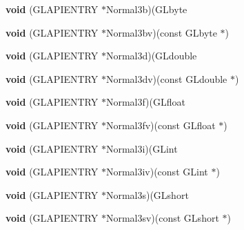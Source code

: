 \begin{DoxyCompactItemize}
{\bfseries void} (G\+L\+A\+P\+I\+E\+N\+T\+RY $\ast$Normal3b)(G\+Lbyte
\item 
\mbox{\label{struct_____g_ldispatch_table_rec_a4e8418c55132720b115a7c1ec9395cbb}} 
{\bfseries void} (G\+L\+A\+P\+I\+E\+N\+T\+RY $\ast$Normal3bv)(const G\+Lbyte $\ast$)
\item 
\mbox{\label{struct_____g_ldispatch_table_rec_a63308fc1a23c3e4e8f3d1923fcc3494b}} 
{\bfseries void} (G\+L\+A\+P\+I\+E\+N\+T\+RY $\ast$Normal3d)(G\+Ldouble
\item 
\mbox{\label{struct_____g_ldispatch_table_rec_a265e7aff94003aaadf77c3502cda620f}} 
{\bfseries void} (G\+L\+A\+P\+I\+E\+N\+T\+RY $\ast$Normal3dv)(const G\+Ldouble $\ast$)
\item 
\mbox{\label{struct_____g_ldispatch_table_rec_ab696168b29771d1810830f54dec40e9d}} 
{\bfseries void} (G\+L\+A\+P\+I\+E\+N\+T\+RY $\ast$Normal3f)(G\+Lfloat
\item 
\mbox{\label{struct_____g_ldispatch_table_rec_a2860b1c5b6099d9d28678f696812fbb8}} 
{\bfseries void} (G\+L\+A\+P\+I\+E\+N\+T\+RY $\ast$Normal3fv)(const G\+Lfloat $\ast$)
\item 
\mbox{\label{struct_____g_ldispatch_table_rec_a43f37e627bc4022850f804b91e4122c2}} 
{\bfseries void} (G\+L\+A\+P\+I\+E\+N\+T\+RY $\ast$Normal3i)(G\+Lint
\item 
\mbox{\label{struct_____g_ldispatch_table_rec_a7efe26292486b33305742d096f5cfe4b}} 
{\bfseries void} (G\+L\+A\+P\+I\+E\+N\+T\+RY $\ast$Normal3iv)(const G\+Lint $\ast$)
\item 
\mbox{\label{struct_____g_ldispatch_table_rec_a2ac65624ade98b1284087b4d0ab05a77}} 
{\bfseries void} (G\+L\+A\+P\+I\+E\+N\+T\+RY $\ast$Normal3s)(G\+Lshort
\item 
\mbox{\label{struct_____g_ldispatch_table_rec_ae0b1f61027cef3327c9e173d22d26c8f}} 
{\bfseries void} (G\+L\+A\+P\+I\+E\+N\+T\+RY $\ast$Normal3sv)(const G\+Lshort $\ast$)

\end{DoxyCompactItemize}

